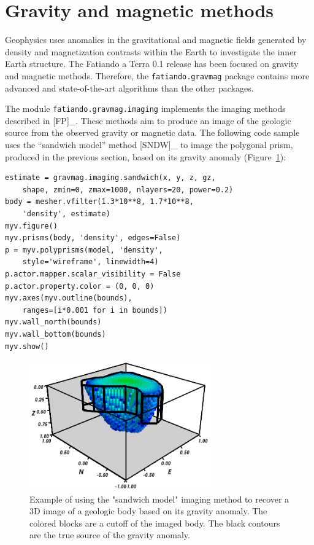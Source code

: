 \section{Gravity and magnetic methods}

Geophysics uses anomalies in the gravitational and magnetic fields
generated by density and magnetization contrasts within the Earth to
investigate the inner Earth structure. The Fatiando a Terra 0.1 release
has been focused on gravity and magnetic methods. Therefore, the
\texttt{fatiando.gravmag} package contains more advanced and
state-of-the-art algorithms than the other packages.

The module \texttt{fatiando.gravmag.imaging} implements the imaging
methods described in {[}FP{]}\_. These methods aim to produce an image
of the geologic source from the observed gravity or magnetic data. The
following code sample uses the ``sandwich model'' method {[}SNDW{]}\_ to
image the polygonal prism, produced in the previous section, based on
its gravity anomaly (Figure~\ref{fig:imaging}):

\begin{verbatim}
estimate = gravmag.imaging.sandwich(x, y, z, gz,
    shape, zmin=0, zmax=1000, nlayers=20, power=0.2)
body = mesher.vfilter(1.3*10**8, 1.7*10**8,
    'density', estimate)
myv.figure()
myv.prisms(body, 'density', edges=False)
p = myv.polyprisms(model, 'density',
    style='wireframe', linewidth=4)
p.actor.mapper.scalar_visibility = False
p.actor.property.color = (0, 0, 0)
myv.axes(myv.outline(bounds),
    ranges=[i*0.001 for i in bounds])
myv.wall_north(bounds)
myv.wall_bottom(bounds)
myv.show()
\end{verbatim}

\begin{figure}
    \centering
    \includegraphics[width=0.7\textwidth]{figures/paper1/gravmag_imaging}
    \caption{
        Example of using the "sandwich model" imaging method to recover a 3D
        image of a geologic body based on its gravity anomaly. The colored
        blocks are a cutoff of the imaged body. The black contours are the true
        source of the gravity anomaly.
    }
    \label{fig:imaging}
\end{figure}

